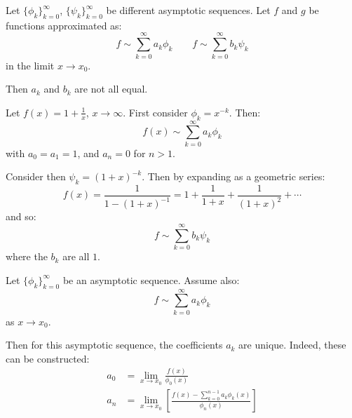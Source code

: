 \documentclass[../Main.tex]{subfiles}
\begin{document}
\begin{proposition}
    Let $\{\phi_k\}_{k = 0}^\infty$, $\{\psi_k\}_{k=0}^\infty$ be different asymptotic sequences. Let $f$ and $g$ be functions approximated as:
    \begin{equation*}
        f \sim \sum_{k=0}^\infty a_k \phi_k\qquad f \sim \sum_{k=0}^\infty b_k \psi_k
    \end{equation*}
    in the limit $x \to x_0$.

    Then $a_k$ and $b_k$ are not all equal.
    \label{propAExpDiffRep}
\end{proposition}
\begin{example}
    Let $f(x) = 1 + \frac1x$, $x \to \infty$. First consider $\phi_k = x^{-k}$. Then:
    \begin{equation*}
        f(x) \sim \sum_{k=0}^{\infty} a_k \phi_k
    \end{equation*}
    with $a_0 = a_1 = 1$, and $a_n = 0$ for $n > 1$.

    Consider then $\psi_k = (1 + x)^{-k}$. Then by expanding as a geometric series:
    \begin{equation*}
        f(x) = \frac{1}{1 - (1 + x)^{-1}} = 1 + \frac{1}{1 + x} + \frac{1}{(1 + x)^2} + \cdots
    \end{equation*}
    and so:
    \begin{equation*}
        f \sim \sum_{k=0}^{\infty} b_k \psi_k
    \end{equation*}
    where the $b_k$ are all $1$.
\end{example}
\begin{proposition}
    Let $\{\phi_k\}_{k=0}^\infty$ be an asymptotic sequence. Assume also:
    \begin{equation*}
        f \sim \sum_{k=0}^{\infty} a_k \phi_k
    \end{equation*}
    as $x \to x_0$.

    Then for this asymptotic sequence, the coefficients $a_k$ are unique. Indeed, these can be constructed:
    \begin{align*}
        a_0 &= \lim_{x \to x_0} \frac{f(x)}{\phi_0(x)} \\
        a_n &= \lim_{x \to x_0} \left[\frac{f(x) - \sum_{k=0}^{n-1} a_k \phi_k(x)}{\phi_n(x)}\right]
    \end{align*}
    \label{propUniqueCoefft}
\end{proposition}
\end{document}
